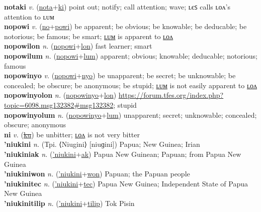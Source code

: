 \textbf{notaki} \textit{v.} (\hyperref[nota]{nota}+\hyperref[ki]{ki})
point out; notify; call attention; wave; ʟєꜱ calls ʟᴏᴧ’s attention to ʟᴜᴍ \label{notaki} \\
\textbf{nopowi} \textit{v.} (\hyperref[no]{no}+\hyperref[powi]{powi})
be apparent; be obvious; be knowable; be deducable; be notorious; be famous; be smart; \hyperref[nopowilum]{ʟᴜᴍ} is apparent to \hyperref[nopowilon]{ʟᴏᴧ} \label{nopowi} \\
\textbf{nopowilon} \textit{n.} (\hyperref[nopowi]{nopowi}+\hyperref[lon]{lon})
fast learner; smart \label{nopowilon} \\
\textbf{nopowilum} \textit{n.} (\hyperref[nopowi]{nopowi}+\hyperref[lum]{lum})
apparent; obvious; knowable; deducable; notorious; famous \label{nopowilum} \\
\textbf{nopowinyo} \textit{v.} (\hyperref[nopowi]{nopowi}+\hyperref[nyo]{nyo})
be unapparent; be secret; be unknowable; be concealed; be obscure; be anonymous; be stupid; \hyperref[nopowinyolum]{ʟᴜᴍ} is not easily apparent to \hyperref[nopowinyolon]{ʟᴏᴧ} \label{nopowinyo} \\
\textbf{nopowinyolon} \textit{n.} (\hyperref[nopowinyo]{nopowinyo}+\hyperref[lon]{lon})
\url{https://forum.tfes.org/index.php?topic=6098.msg132382\#msg132382}; stupid \label{nopowinyolon} \\
\textbf{nopowinyolum} \textit{n.} (\hyperref[nopowinyo]{nopowinyo}+\hyperref[lum]{lum})
unapparent; secret; unknowable; concealed; obscure; anonymous \label{nopowinyolum} \\
\textbf{ni} \textit{v.} (\hyperref[ku]{\sout{ku}})
be unbitter; \hyperref[nilon]{ʟᴏᴧ} is not very bitter \label{ni} \\
\textbf{'niukini} \textit{n.} (Tpi. ⟨Niugini⟩ [niuɡini])
Papua; New Guinea; Irian \label{'niukini} \\
\textbf{'niukiniak} \textit{n.} (\hyperref['niukini]{'niukini}+\hyperref[ak]{ak})
Papua New Guinean; Papuan; from Papua New Guinea \label{'niukiniak} \\
\textbf{'niukiniwon} \textit{n.} (\hyperref['niukini]{'niukini}+\hyperref[won]{won})
Papuan; the Papuan people \label{'niukiniwon} \\
\textbf{'niukinitec} \textit{n.} (\hyperref['niukini]{'niukini}+\hyperref[tec]{tec})
Papua New Guinea; Independent State of Papua New Guinea \label{'niukinitec} \\
\textbf{'niukinitilip} \textit{n.} (\hyperref['niukini]{'niukini}+\hyperref[tilip]{tilip})
Tok Pisin \label{'niukinitilip} \\
